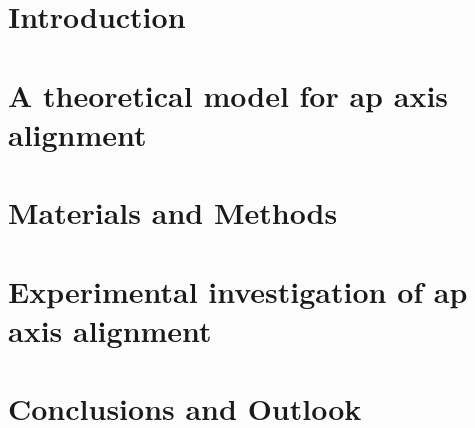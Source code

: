 \documentclass[
    BCOR=6mm,
    DIV=13,
    draft=false,
    titlepage=true,
    twoside=false,
    toc=bib,
    parskip=half-,
    chapterprefix=true,
    appendixprefix=true,
    footnotes=multiple,
    headsepline=true]{scrreprt}
\begin{document}
\pagestyle{scrheadings}




\tableofcontents
\listoffigures

\cleardoubleoddpage
{}

\chapter{Introduction}\label{ch:APAxisIntro}


\chapter{A theoretical model for \acs{ap} axis alignment}\label{ch:ActiveMatter}


\chapter{Materials and Methods}\label{ch:Exp}


\chapter{Experimental investigation of \acs{ap} axis alignment}\label{ch:Results}


\chapter{Conclusions and Outlook}\label{ch:Summary}


\printbibliography[title={Bibliography}]
\end{document}

